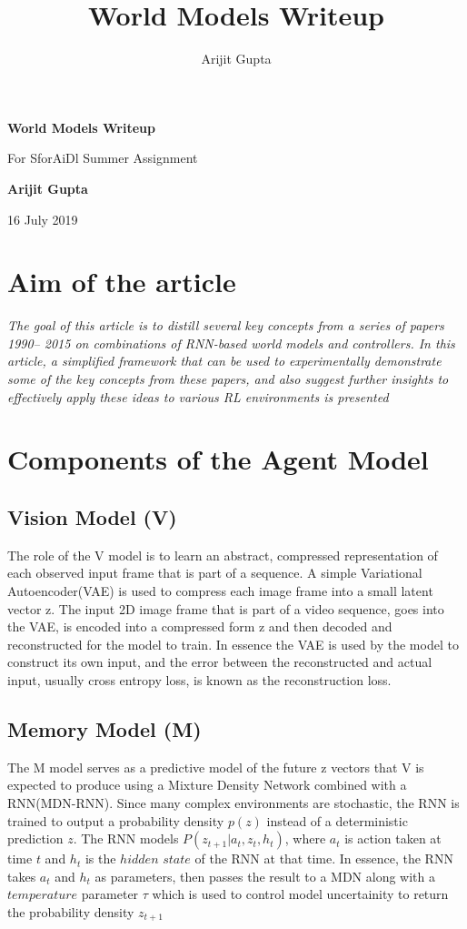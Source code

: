 \documentclass[a4paper]{article}
\title{World Models Writeup}
\author{Arijit Gupta}
\begin{document}
\begin{titlepage}
    \begin{center}
        \vspace*{1cm}
        \Huge
        \textbf{World Models Writeup}
        
        \vspace{0.5cm}
        \LARGE
        For SforAiDl Summer Assignment
        
        \vspace{1.5cm}
        \textbf{Arijit Gupta}
        
        \vfill
        16 July 2019
    \end{center}
\end{titlepage}

\section*{{Aim of the article}}

\textit
{The goal of this article\autocite{WEBSITE:1} is to distill several key concepts from a series of papers 1990– 2015 on combinations of RNN-based world models and controllers. In this article, a simplified framework that can be used to experimentally demonstrate some of the key concepts from these papers, and also suggest further insights to effectively apply these ideas to various RL environments is presented}
\section{Components of the Agent Model}
\subsection{Vision Model (V)}
The role of the V model is to learn an abstract, compressed representation of each observed input frame that is part of a sequence. A simple Variational Autoencoder(VAE) is used to compress each image frame into a small latent vector z. The input 2D image frame that is part of a video sequence, goes into the VAE, is encoded into a compressed form z and then decoded and reconstructed for the model to train. In essence the VAE is used by the model to construct its own input, and the error between the reconstructed and actual input, usually cross entropy loss, is known as the reconstruction loss.
\subsection{Memory Model (M)}
The M model serves as a predictive model of the future z vectors that V is expected to produce using a Mixture Density Network combined with a RNN(MDN-RNN). Since many complex environments are stochastic, the RNN is trained to output a probability density $p(z)$ instead of a deterministic prediction $z$. The RNN models $P(z_{t+1} | a_t, z_t, h_t)$, where $a_t$ is action taken at time $t$ and $h_t$ is the $hidden$ $state$ of the RNN at that time.
\newline
\newline
In essence, the RNN takes $a_t$ and $h_t$ as parameters, then passes the result to a MDN along with a $temperature$ parameter $\tau$ which is used to control model uncertainity to return the probability density $z_{t+1}$
\end{document}
